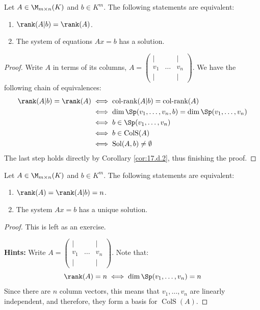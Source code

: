 \begin{proposition}
\label{prop:rank_solvability_criterion}
Let $A \in \M_{m \times n}(K)$ and $b \in K^m$. The following statements are equivalent:
\begin{enumerate}
    \item $\rank(A|b) = \rank(A)$.
    \item The system of equations $Ax = b$ has a solution.
\end{enumerate}
\end{proposition}

\begin{proof}
Write $A$ in terms of its columns, $A = \begin{pmatrix} | & & | \\ v_1 & \dots & v_n \\ | & & | \end{pmatrix}$. We have the following chain of equivalences:
\begin{align*}
    \rank(A|b) = \rank(A) &\iff \operatorname{col-rank}(A|b) = \operatorname{col-rank}(A) \\
    &\iff \dim \Sp(v_1, \dots, v_n, b) = \dim \Sp(v_1, \dots, v_n) \\
    &\iff b \in \Sp(v_1, \dots, v_n) \\
    &\iff b \in \operatorname{ColS}(A) \\
    &\iff \operatorname{Sol}(A, b) \neq \emptyset
\end{align*}
The last step holds directly by Corollary \ref{cor:17.d.2}, thus finishing the proof.
\end{proof}

\begin{proposition}
\label{prop:unique_solution_rank_criterion}
Let $A \in \M_{m \times n}(K)$ and $b \in K^m$. The following statements are equivalent:
\begin{enumerate}
    \item $\rank(A) = \rank(A|b) = n$.
    \item The system $Ax = b$ has a unique solution.
\end{enumerate}
\end{proposition}

\begin{proof}
This is left as an exercise.

\textbf{Hints:} Write $A = \begin{pmatrix} | & & | \\ v_1 & \dots & v_n \\ | & & | \end{pmatrix}$. Note that:
\begin{equation*}
    \rank(A) = n \iff \dim \Sp(v_1, \dots, v_n) = n
\end{equation*}
Since there are $n$ column vectors, this means that $v_1, \dots, v_n$ are linearly independent, and therefore, they form a basis for $\operatorname{ColS}(A)$.
\end{proof}


